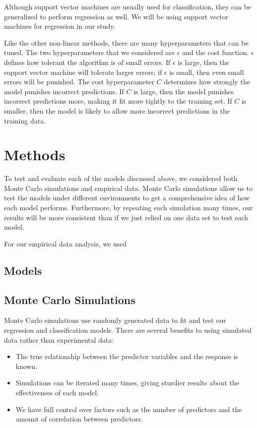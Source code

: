 \documentclass{article}
\begin{document}
Although support vector machines are usually used for classification, they can be generalized to perform regression as well. We will be using support vector machines for regression in our study.

Like the other non-linear methods, there are many hyperparameters that can be tuned. The two hyperparameters that we considered are $\epsilon$ and the cost function. $\epsilon$ defines how tolerant the algorithm is of small errors. If $\epsilon$ is large, then the support vector machine will tolerate larger errors; if $\epsilon$ is small, then even small errors will be punished. The cost hyperparameter $C$ determines how strongly the model punishes incorrect predictions. If $C$ is large, then the model punishes incorrect predictions more, making it fit more tightly to the training set. If $C$ is smaller, then the model is likely to allow more incorrect predictions in the training data.

\section{Methods}
To test and evaluate each of the models discussed above, we considered both Monte Carlo simulations and empirical data. Monte Carlo simulations allow us to test the models under different environments to get a comprehensive idea of how each model performs. Furthermore, by repeating each simulation many times, our results will be more consistent than if we just relied on one data set to test each model.

For our empirical data analysis, we used
\subsection{Models}

\subsection{Monte Carlo Simulations}

Monte Carlo simulations use randomly generated data to fit and test our regression and classification models. There are several benefits to using simulated data rather than experimental data:
\begin{itemize}
	\item The true relationship between the predictor variables and the response is known.
	\item Simulations can be iterated many times, giving sturdier results about the effectiveness of each model.
	\item We have full control over factors such as the number of predictors and the amount of correlation between predictors.
\end{itemize}
\end{document}
